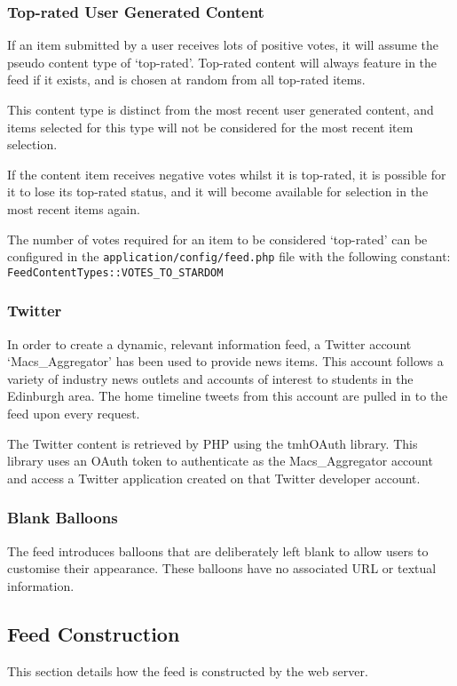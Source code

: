 \subsubsection{Top-rated User Generated Content}
If an item submitted by a user receives lots of positive votes, it will assume the pseudo content type of `top-rated'. Top-rated content will always feature in the feed if it exists, and is chosen at random from all top-rated items.

This content type is distinct from the most recent user generated content, and items selected for this type will not be considered for the most recent item selection.

If the content item receives negative votes whilst it is top-rated, it is possible for it to lose its top-rated status, and it will become available for selection in the most recent items again.

The number of votes required for an item to be considered `top-rated' can be configured in the \texttt{application/config/feed.php} file with the following constant: \\ \texttt{FeedContentTypes::VOTES\_TO\_STARDOM}

\subsubsection{Twitter}
In order to create a dynamic, relevant information feed, a Twitter account `Macs\_Aggregator' has been used to provide news items. This account follows a variety of industry news outlets and accounts of interest to students in the Edinburgh area. The home timeline tweets from this account are pulled in to the feed upon every request.

The Twitter content is retrieved by PHP using the tmhOAuth library. This library uses an OAuth token to authenticate as the Macs\_Aggregator account and access a Twitter application created on that Twitter developer account.

\subsubsection{Blank Balloons}
The feed introduces balloons that are deliberately left blank to allow users to customise their appearance. These balloons have no associated URL or textual information.

\subsection{Feed Construction}
This section details how the feed is constructed by the web server.

